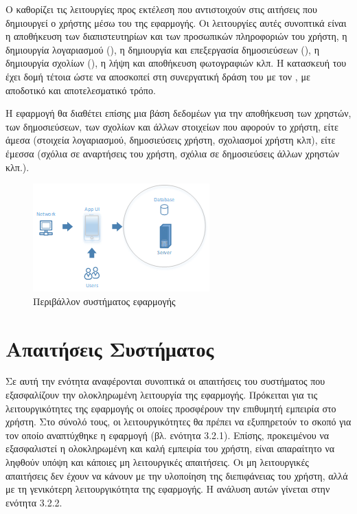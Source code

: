 Ο  καθορίζει τις λειτουργίες προς εκτέλεση που αντιστοιχούν στις αιτήσεις που δημιουργεί ο χρήστης μέσω του  της εφαρμογής. Οι λειτουργίες αυτές συνοπτικά είναι η αποθήκευση των διαπιστευτηρίων και των προσωπικών πληροφοριών του χρήστη, η δημιουργία λογαριασμού (), η δημιουργία και επεξεργασία δημοσιεύσεων (), η δημιουργία σχολίων (), η λήψη και αποθήκευση φωτογραφιών κλπ. Η κατασκευή του  έχει δομή τέτοια ώστε να αποσκοπεί στη συνεργατική δράση του με τον , με αποδοτικό και αποτελεσματικό τρόπο.

Η εφαρμογή θα διαθέτει επίσης μια βάση δεδομέων για την αποθήκευση των χρηστών, των δημοσιεύσεων, των σχολίων και άλλων στοιχείων που αφορούν το χρήστη, είτε άμεσα (στοιχεία λογαριασμού, δημοσιεύσεις χρήστη, σχολιασμοί χρήστη κλπ), είτε έμεσσα (σχόλια σε αναρτήσεις του χρήστη, σχόλια σε δημοσιεύσεις άλλων χρηστών κλπ.).  


\begin{figure}[h]
    \centering
    \includegraphics[scale=1]{figures/app-ecosystem.png}
    \caption{Περιβάλλον συστήματος εφαρμογής}
    \label{appecosystem}
\end{figure}

\section{Απαιτήσεις Συστήματος}
Σε αυτή την ενότητα αναφέρονται συνοπτικά οι απαιτήσεις του συστήματος που εξασφαλίζουν την ολοκληρωμένη λειτουργία της εφαρμογής. Πρόκειται για τις λειτουργικότητες της εφαρμογής οι οποίες προσφέρουν την επιθυμητή εμπειρία στο χρήστη. Στο σύνολό τους, οι λειτουργικότητες θα πρέπει να εξυπηρετούν το σκοπό για τον οποίο αναπτύχθηκε η εφαρμογή (βλ. ενότητα 3.2.1). Επίσης, προκειμένου να εξασφαλιστεί η ολοκληρωμένη και καλή εμπειρία του χρήστη, είναι απαραίτητο να ληφθούν υπόψη και κάποιες μη λειτουργικές απαιτήσεις. Οι μη λειτουργικές απαιτήσεις δεν έχουν να κάνουν με την υλοποίηση της διεπιφάνειας του χρήστη, αλλά με τη γενικότερη λειτουργικότητα της εφαρμογής. Η ανάλυση αυτών γίνεται στην ενότητα 3.2.2.

